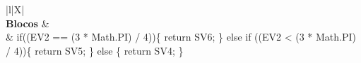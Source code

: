 \begin{xltabular}{\textwidth}{|l|X|}
		 \\ \hline
		\textbf{Blocos} &  \\ \hline
		 & if((EV2 == (3 * Math.PI) / 4))\{   return SV6; \} else if ((EV2 < (3 * Math.PI) / 4))\{   return SV5; \} else \{   return SV4; \} \\ \hline



\end{xltabular}
